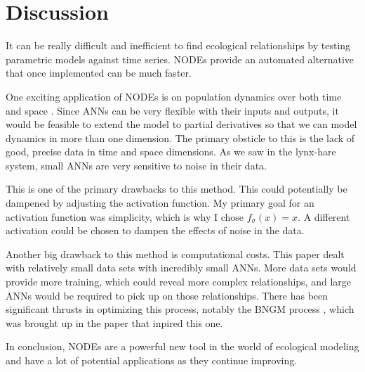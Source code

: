 \documentclass{article}
\begin{document}
\section{Discussion}
It can be really difficult and inefficient to find ecological relationships by testing parametric models against time series. NODEs provide an automated alternative that once implemented can be much faster. 

One exciting application of NODEs is on population dynamics over both time and space \cite{earlierpaper}. Since ANNs can be very flexible with their inputs and outputs, it would be feasible to extend the model to partial derivatives so that we can model dynamics in more than one dimension. The primary obsticle to this is the lack of good, precise data in time and space dimensions. As we saw in the lynx-hare system, small ANNs are very sensitive to noise in their data. 

This is one of the primary drawbacks to this method. This could potentially be dampened by adjusting the activation function. My primary goal for an activation function was simplicity, which is why I chose $f_\sigma(x)=x$. A different activation could be chosen to dampen the effects of noise in the data.

Another big drawback to this method is computational costs. This paper dealt with relatively small data sets with incredibly small ANNs. More data sets would provide more training, which could reveal more complex relationships, and large ANNs would be required to pick up on those relationships. There has been significant thrusts in optimizing this process, notably the BNGM process \cite{primarypaper}, which was brought up in the paper that inpired this one.

In conclusion, NODEs are a powerful new tool in the world of ecological modeling and have a lot of potential applications as they continue improving.



\end{document}
